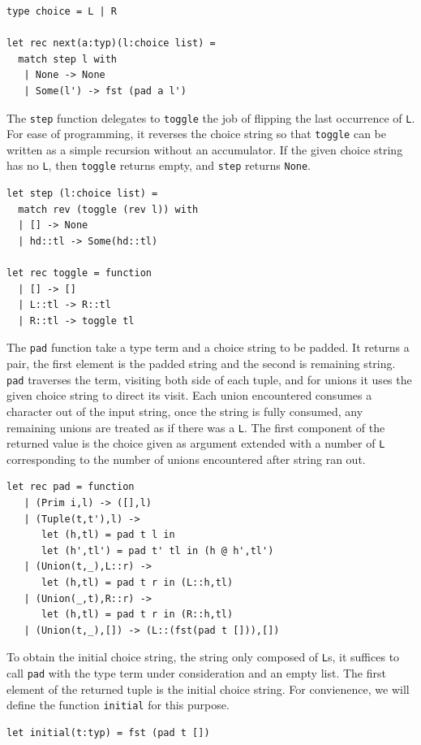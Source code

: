 \documentclass[a4paper,english]{lipics-v2019}
\renewcommand{\L}{{\tt L}\xspace}
\newcommand{\Ls}{{\tt L}s\xspace}
\renewcommand{\c}[1]{\lstinline{#1}\xspace}
\begin{document}
\begin{lstlisting}
type choice = L | R

let rec next(a:typ)(l:choice list) = 
  match step l with
   | None -> None
   | Some(l') -> fst (pad a l')
\end{lstlisting}

The \c{step} function delegates to \c{toggle} the job of flipping the last
occurrence of \L. For ease of programming, it reverses the choice string so
that \c{toggle} can be written as a simple recursion without an accumulator.
If the given choice string has no \L, then \c{toggle} returns empty, and
\c{step} returns \c{None}.

\begin{lstlisting}
let step (l:choice list) =
  match rev (toggle (rev l)) with
  | [] -> None
  | hd::tl -> Some(hd::tl)

let rec toggle = function
  | [] -> []    
  | L::tl -> R::tl
  | R::tl -> toggle tl
\end{lstlisting}

The \c{pad} function take a type term and a choice string to be padded. It
returns a pair, the first element is the padded string and the second is
remaining string. \c{pad} traverses the term, visiting both side of each
tuple, and for unions it uses the given choice string to direct its visit.
Each union encountered consumes a character out of the input string, once
the string is fully consumed, any remaining unions are treated as if there
was a \L. The first component of the returned value is the choice given as
argument extended with a number of \L corresponding to the number of unions
encountered after string ran out.

\begin{lstlisting}
let rec pad = function
   | (Prim i,l) -> ([],l)
   | (Tuple(t,t'),l) -> 
      let (h,tl) = pad t l in
      let (h',tl') = pad t' tl in (h @ h',tl')
   | (Union(t,_),L::r) -> 
      let (h,tl) = pad t r in (L::h,tl)
   | (Union(_,t),R::r) -> 
      let (h,tl) = pad t r in (R::h,tl)
   | (Union(t,_),[]) -> (L::(fst(pad t [])),[])
\end{lstlisting}

To obtain the initial choice string, the string only composed of \Ls, it
suffices to call \c{pad} with the type term under consideration and an empty
list. The first element of the returned tuple is the initial choice string. For
convienence, we will define the function \c{initial} for this purpose.

\begin{lstlisting}
let initial(t:typ) = fst (pad t [])
\end{lstlisting}
\end{document}
